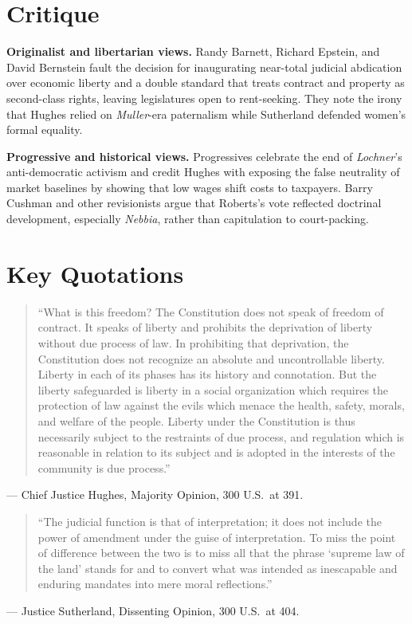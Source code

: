 \documentclass[12pt]{article}
\begin{document}
\section{Critique}

\textbf{Originalist and libertarian views.} Randy Barnett, Richard Epstein, and David Bernstein fault the decision for inaugurating near-total judicial abdication over economic liberty and a double standard that treats contract and property as second-class rights, leaving legislatures open to rent-seeking. They note the irony that Hughes relied on \textit{Muller}-era paternalism while Sutherland defended women's formal equality.

\textbf{Progressive and historical views.} Progressives celebrate the end of \textit{Lochner}'s anti-democratic activism and credit Hughes with exposing the false neutrality of market baselines by showing that low wages shift costs to taxpayers. Barry Cushman and other revisionists argue that Roberts's vote reflected doctrinal development, especially \textit{Nebbia}, rather than capitulation to court-packing.

\section{Key Quotations}

\begin{quote}
``What is this freedom? The Constitution does not speak of freedom of contract. It speaks of liberty and prohibits the deprivation of liberty without due process of law. In prohibiting that deprivation, the Constitution does not recognize an absolute and uncontrollable liberty. Liberty in each of its phases has its history and connotation. But the liberty safeguarded is liberty in a social organization which requires the protection of law against the evils which menace the health, safety, morals, and welfare of the people. Liberty under the Constitution is thus necessarily subject to the restraints of due process, and regulation which is reasonable in relation to its subject and is adopted in the interests of the community is due process.''
\end{quote}
\noindent --- Chief Justice Hughes, Majority Opinion, 300 U.S.\ at 391.

\begin{quote}
``The judicial function is that of interpretation; it does not include the power of amendment under the guise of interpretation. To miss the point of difference between the two is to miss all that the phrase `supreme law of the land' stands for and to convert what was intended as inescapable and enduring mandates into mere moral reflections.''
\end{quote}
\noindent --- Justice Sutherland, Dissenting Opinion, 300 U.S.\ at 404.
\end{document}
